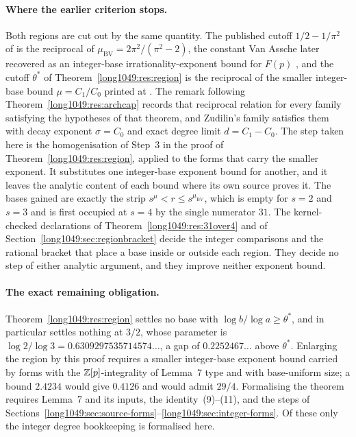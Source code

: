 \documentclass[11pt]{article}
\begin{document}
\paragraph{Where the earlier criterion stops.}
Both regions are cut out by the same quantity.  The published cutoff
$1/2-1/\pi^{2}$ of \cite[Thm.~2, p.~177]{bv1994} is the reciprocal of
$\mu_{\mathrm{BV}}=2\pi^{2}/(\pi^{2}-2)$, the constant Van Assche later
recovered as an integer-base irrationality-exponent bound for $F(p)$
\cite[Thm.~1, p.~10]{vanassche2001}, and the cutoff $\theta^{*}$ of
Theorem~\ref{long1049:res:region} is the reciprocal of the smaller integer-base bound
$\mu=C_1/C_0$ printed at \cite[p.~162]{zudilin2004}.  The remark following
Theorem~\ref{long1049:res:archcap} records that reciprocal relation for every family
satisfying the hypotheses of that theorem, and Zudilin's family satisfies them
with decay exponent $\sigma=C_0$ and exact degree limit $d=C_1-C_0$.  The step
taken here is the homogenisation of Step~3 in the proof of
Theorem~\ref{long1049:res:region}, applied to the forms that carry the smaller exponent.
It substitutes one integer-base exponent bound for another, and it leaves the
analytic content of each bound where its own source proves it.  The bases
gained are exactly the strip $s^{\mu}<r\le s^{\mu_{\mathrm{BV}}}$, which is empty
for $s=2$ and $s=3$ and is first occupied at $s=4$ by the single numerator
$31$.  The kernel-checked declarations of Theorem~\ref{long1049:res:31over4} and of
Section~\ref{long1049:sec:regionbracket} decide the integer comparisons and the rational
bracket that place a base inside or outside each region.  They decide no step
of either analytic argument, and they improve neither exponent bound.

\paragraph{The exact remaining obligation.}
Theorem~\ref{long1049:res:region} settles no base with $\log b/\log a\ge\theta^{*}$, and
in particular settles nothing at $3/2$, whose parameter is
$\log2/\log3=0.6309297535714574\ldots$, a gap of $0.2252467\ldots$ above
$\theta^{*}$.  Enlarging the region by this proof requires a smaller integer-base
exponent bound carried by forms with the $\mathbb{Z}[p]$-integrality of Lemma~7 type and
with base-uniform size; a bound $2.4234$ would give $0.4126$ and would admit
$29/4$.  Formalising the theorem requires Lemma~7 and its inputs, the
identity~(9)--(11), and the steps of
Sections~\ref{long1049:sec:source-forms}--\ref{long1049:sec:integer-forms}.  Of these only the
integer degree bookkeeping is formalised here.
\end{document}
